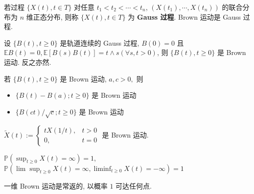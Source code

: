 \documentclass[10pt]{yerbaformat}
\begin{document}
\begin{definition}[Gauss 过程]
    若过程 $\{X(t), t \in T\}$ 对任意 $t_{1}<t_{2}<\cdots<t_{n}$, $
        \left(X\left(t_{1}\right), \cdots, X\left(t_{n}\right)\right)$ 的联合分布为 $n$ 维正态分布, 则称 $\{X(t), t \in T\}$ 为 \textbf{Gauss 过程}. Brown 运动是 Gauss 过程.
\end{definition}

\begin{theorem}
    设 $\{B(t), t \geq 0\}$ 是轨道连续的 Gauss 过程, $B(0)=0$ 且 $ \mathbb{E} B(t)=0, \mathbb{E}[B(s) B(t)]=t \wedge s(\forall s, t>0)$, 则 $\{B(t), t \geq 0\}$ 是 Brown 运动. 反之亦然.
\end{theorem}

\begin{theorem}[不变性]
    若 $\{B(t), t \geq 0\}$ 是 Brown 运动, $a, c>0,$ 则
    \begin{itemize}
        \item $\{B(t)-B(a) ; t \geq 0\}$ 是 Brown 运动
        \item $\{B(c t) / \sqrt{c} ; t \geq 0\}$ 是 Brown 运动
    \end{itemize}
\end{theorem}

\begin{theorem}
    $\tilde{X}(t):=\left\{\begin{array}{ll}t X(1 / t), & t>0 \\ 0, & t=0\end{array}\right.$ 是 Brown 运动.
\end{theorem}

\begin{theorem}
    $\mathbb{P}\left(\sup _{t \geq 0} X(t)=\infty\right)=1$, $\mathbb{P}\left(\lim \sup _{t \geq 0} X(t)=\infty, \liminf _{t \geq 0} X(t)=-\infty\right)=1$
\end{theorem}

\begin{lemma}
    一维 Brown 运动是常返的, 以概率 $1$ 可达任何点.
\end{lemma}
\end{document}
